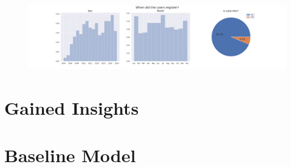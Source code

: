 \documentclass{article}
\begin{document}
\begin{figure}[!h]
  \centering
  \label{fig:subscriber-registration}
  \includegraphics[width = \textwidth]{../../images/subscriber-registration.png}
\end{figure}

\section{Gained Insights}

\section{Baseline Model}
\end{document}

